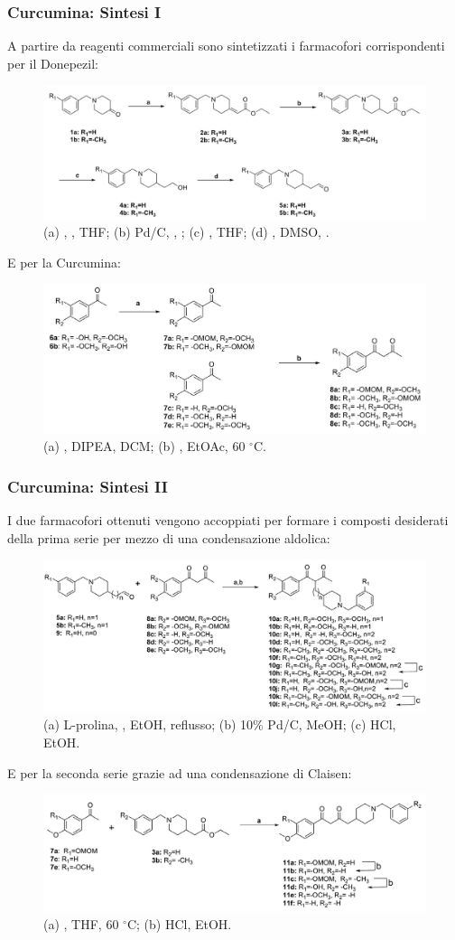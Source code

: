 \documentclass[9pt]{beamer}
\begin{document}
\begin{frame}
	\frametitle{Curcumina: Sintesi I}
	A partire da reagenti commerciali sono sintetizzati i farmacofori corrispondenti per il Donepezil:
	\begin{figure}
		\includegraphics[width=.7\textwidth]{immagini/farmadone_curcdone.png}
		{\caption*{\tiny{(a) ,  , THF;   (b) Pd/C,  , ;   (c)  , THF; (d) , DMSO, .}}}
	\end{figure}
	E per la Curcumina:
	\begin{figure}
		\includegraphics[width=.7\textwidth]{immagini/farmacurc_curcdone.png}
		{\caption*{\tiny{(a) , DIPEA, DCM; (b)  , EtOAc, 60 $^\circ$C.}}}
	\end{figure}
\end{frame}

\begin{frame}
	\frametitle{Curcumina: Sintesi II}
	I due farmacofori ottenuti vengono accoppiati per formare i composti desiderati della prima serie per mezzo di una condensazione aldolica:
	\begin{figure}
		\includegraphics[width=.7\textwidth]{immagini/condserie1_curcdone.png}
		{\caption*{\tiny{(a) L-prolina,  , EtOH, reflusso; (b) 10\% Pd/C, MeOH; (c) HCl, EtOH.}}}
	\end{figure}
	E per la seconda serie grazie ad una condensazione di Claisen:
	\begin{figure}
		\includegraphics[width=.7\textwidth]{immagini/condserie2_curcdone.png}
		{\caption*{\tiny{(a)  , THF, 60 $^\circ$C; (b) HCl, EtOH.}}}
	\end{figure}
\end{frame}
\end{document}
